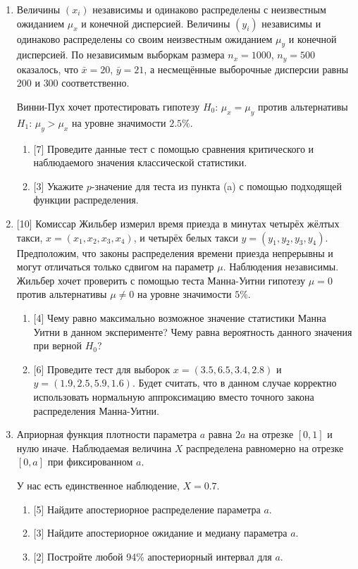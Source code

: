 \documentclass[12pt]{article}
\begin{document}
\begin{enumerate}
    \item Величины $(x_i)$ независимы и одинаково распределены с неизвестным ожиданием $\mu_x$ и конечной дисперсией.
    Величины $(y_i)$ независимы и одинаково распределены со своим неизвестным ожиданием $\mu_y$ и конечной дисперсией. 
    По независимым выборкам размера $n_x = 1000$, $n_y = 500$ оказалось, что $\bar x = 20$, $\bar y = 21$,
    а несмещённые выборочные дисперсии равны $200$ и $300$ соответственно. 

    Винни-Пух хочет протестировать гипотезу $H_0$: $\mu_x  = \mu_y$ против альтернативы $H_1$: $\mu_y > \mu_x$ на уровне значимости $2.5\%$.
    \begin{enumerate}
        \item {[7]} Проведите данные тест с помощью сравнения критического и наблюдаемого значения классической статистики. 
        \item {[3]} Укажите $p$-значение для теста из пункта (a) с помощью подходящей функции распределения.
    \end{enumerate}

    \item {[10]} Комиссар Жильбер измерил время приезда в минутах четырёх жёлтых такси, $x = (x_1, x_2, x_3, x_4)$, и четырёх белых такси $y = (y_1, y_2, y_3, y_4)$.
    Предположим, что законы распределения времени приезда непрерывны и могут отличаться только сдвигом на параметр $\mu$. 
    Наблюдения независимы.  Жильбер хочет проверить с помощью теста Манна-Уитни гипотезу $\mu = 0$ против альтернативы $\mu \neq 0$ на уровне значимости $5\%$.
    \begin{enumerate}
        \item {[4]} Чему равно максимально возможное значение статистики Манна Уитни в данном эксперименте? 
        Чему равна вероятность данного значения при верной $H_0$?
        \item {[6]} Проведите тест для выборок $x = (3.5, 6.5, 3.4, 2.8)$ и $y = (1.9, 2.5, 5.9, 1.6)$.
        Будет считать, что в данном случае корректно использовать нормальную аппроксимацию вместо точного закона распределения Манна-Уитни.
    \end{enumerate}
    
    
    

    \item Априорная функция плотности параметра $a$ равна $2a$ на отрезке $[0, 1]$ и нулю иначе.
    Наблюдаемая величина $X$ распределена равномерно на отрезке $[0, a]$ при фиксированном $a$.

    У нас есть единственное наблюдение, $X = 0.7$.

    \begin{enumerate}
        \item {[5]} Найдите апостериорное распределение параметра $a$. 
        \item {[3]} Найдите апостериорное ожидание и медиану параметра $a$. 
        \item {[2]} Постройте любой 94\% апостериорный интервал для $a$. 
    \end{enumerate}

\end{enumerate}
\end{document}
